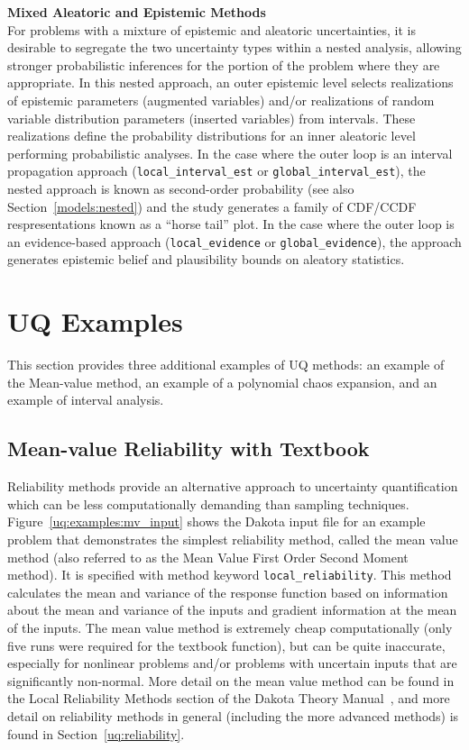 {\bf Mixed Aleatoric and Epistemic Methods} \\
For problems with a mixture of epistemic and aleatoric uncertainties, 
it is desirable to segregate the two uncertainty types within a nested 
analysis, allowing stronger probabilistic inferences for the portion
of the problem where they are appropriate. In this nested approach, an outer 
epistemic level selects realizations of epistemic parameters (augmented
variables) and/or realizations of random variable distribution
parameters (inserted variables) from intervals. These realizations
define the probability distributions for an inner aleatoric level
performing probabilistic analyses. In the case where the outer loop
is an interval propagation approach (\texttt{local\_interval\_est} or 
\texttt{global\_interval\_est}), the nested approach is
known as second-order probability (see also Section~\ref{models:nested})
and the study generates a family of CDF/CCDF respresentations known as a 
``horse tail'' plot. In the case where the outer loop is an 
evidence-based approach (\texttt{local\_evidence} or 
\texttt{global\_evidence}), the approach generates epistemic belief 
and plausibility bounds on aleatory statistics.

\section{UQ Examples}
This section provides three additional examples of UQ methods: 
an example of the Mean-value method, an example of a polynomial
chaos expansion, and an example of interval analysis. 
 
\subsection{Mean-value Reliability with Textbook}\label{uq:examples:mv}

Reliability methods provide an alternative approach to uncertainty
quantification which can be less computationally demanding than
sampling techniques. 
Figure~\ref{uq:examples:mv_input} shows the Dakota input file for an
example problem that demonstrates the simplest reliability method,
called the mean value method (also referred to as the Mean Value First
Order Second Moment method). It is specified with method keyword
\texttt{local\_reliability}. This method calculates the mean and
variance of the response function based on information about the mean
and variance of the inputs and gradient information at the mean of the
inputs. The mean value method is extremely cheap computationally (only
five runs were required for the textbook function), but can be quite
inaccurate, especially for nonlinear problems and/or problems with
uncertain inputs that are significantly non-normal. More detail on the
mean value method can be found in the Local Reliability Methods
section of the Dakota Theory Manual~\cite{TheoMan}, and more detail on
reliability methods in general (including the more advanced methods)
is found in Section~\ref{uq:reliability}.

